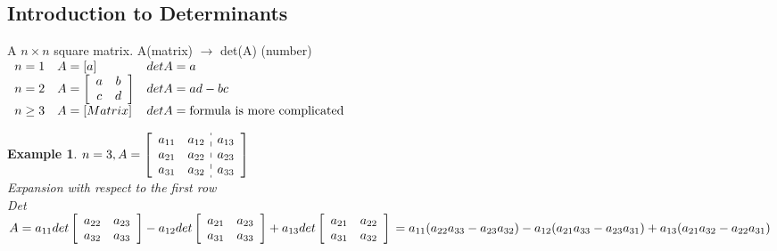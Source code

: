 \documentclass[a4paper,12pt,openany]{book}
\theoremstyle{defn}
\theoremstyle{expl}
\newtheorem{expl}{Example}[section]
\begin{document}
\section{Introduction to Determinants}
	A $n\times n$ square matrix. A(matrix) $\rightarrow$ det(A) (number)\\
	$\begin{array}{cll}
		n=1&A=[a]& det A = a\\
		n=2&A=\left[\begin{array}{cc}a&b\\c&d\end{array}\right]&det A = ad-bc\\
		n\ge 3&A=[Matrix]&det A = \textup{formula is more complicated}
	\end{array}$
	\begin{expl}
		$n=3, A=\left[ \begin{array}{cc:c}
			a_{11} & a_{12} &a_{13}\\
			a_{21} & a_{22} &a_{23}\\
			a_{31} & a_{32} &a_{33}\\
		\end{array} \right]$\\
	\textup{Expansion with respect to the first row\\ Det}
	$A = a_{11}det\left[\begin{array}{cc}a_{22} &a_{23}\\a_{32} &a_{33}\end{array}\right]-a_{12}det\left[\begin{array}{cc}a_{21} &a_{23}\\a_{31} &a_{33}\end{array}\right]+a_{13}det\left[\begin{array}{cc}a_{21} &a_{22}\\a_{31} &a_{32}\end{array}\right]\\
	=a_{11}(a_{22}a_{33}-a_{23}a_{32})-a_{12}(a_{21}a_{33}-a_{23}a_{31})+a_{13}(a_{21}a_{32}-a_{22}a_{31})\\$
	\end{expl}
\section{}
\section{}
\chapter{}
\section{}
\end{document}
